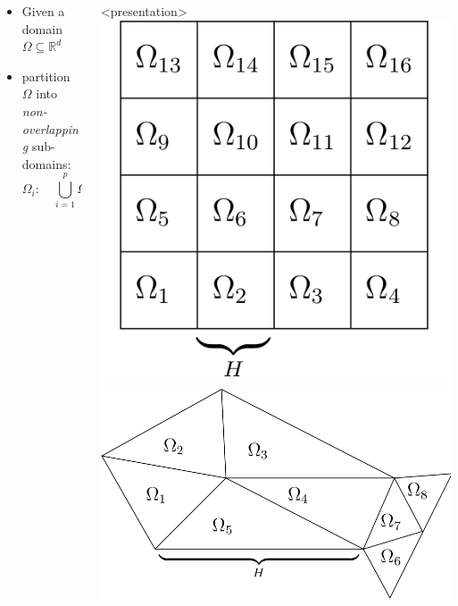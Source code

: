 \begin{frame}
\begin{columns}
\begin{column}{0.6\linewidth}
      \begin{itemize}
      \item Given a domain $\Omega\subseteq\mathbb{R}^d$
      \item partition $\Omega$ into \emph{non-overlapping}
        sub-domains:
        \[
        \Omega_i\colon\quad \bigcup_{i=1}^p \overline{\Omega_i} = \overline{\Omega}, \quad
        \Omega_i\cap\Omega_j=\emptyset \;\forall i\ne j.
        \]
      \end{itemize}
    \end{column}
    \begin{column}{0.4\linewidth}
      \begin{onlyenv}<presentation>
        \includegraphics[width=0.6\linewidth]{EPS/konstr_n_uberl_str}
        \vskip5mm
        \includegraphics[width=0.9\linewidth]{EPS/konstr_n_uberl_unstr}
      \end{onlyenv}

\end{column}
\end{columns}
\end{frame}
